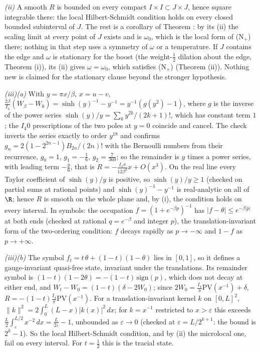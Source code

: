\emph{(ii)} A smooth $R$ is bounded on every compact $I \times I \subset J \times J$, hence square integrable there: the local Hilbert-Schmidt condition holds on every closed bounded subinterval of $J$. The rest is a corollary of Theorem : by its (ii) the scaling limit at every point of $J$ exists and is $\omega_{0}$, which is the local form of (N$_{+}$) there; nothing in that step uses a symmetry of $\omega$ or a temperature. If $J$ contains the edge and $\omega$ is stationary for the boost (the weight-$\tfrac12$ dilation about the edge, Theorem (i)), its (ii) gives $\omega = \omega_{0}$, which satisfies (N$_{+}$) (Theorem (ii)). Nothing new is claimed for the stationary clause beyond the stronger hypothesis.

\emph{(iii)(a)} With $y = \pi x/\beta$, $x = u - v$, $\tfrac{2\beta}{I_{4}}(W_{\beta} - W_{0}) = \sinh(y)^{-1} - y^{-1} = y^{-1}(g(y^{2}) - 1)$, where $g$ is the inverse of the power series $\sinh(y)/y = \sum_{k}y^{2k}/(2k + 1)!$, which has constant term $1$; the $I_{4}0$ prescriptions of the two poles at $y = 0$ coincide and cancel. The check inverts the series exactly to order $y^{18}$ and confirms $g_{n} = 2(1 - 2^{2n - 1})B_{2n}/(2n)!$ with the Bernoulli numbers from their recurrence, $g_{0} = 1$, $g_{1} = -\tfrac16$, $g_{2} = \tfrac{7}{360}$; so the remainder is $y$ times a power series, with leading term $-\tfrac{y}{6}$, that is $R = -\tfrac{I_{4}\pi}{12\beta^{2}}x + O(x^{3})$. On the real line every Taylor coefficient of $\sinh(y)/y$ is positive, so $\sinh(y)/y \ge 1$ (checked on partial sums at rational points) and $\sinh(y)^{-1} - y^{-1}$ is real-analytic on all of $\R$; hence $R$ is smooth on the whole plane and, by (i), the condition holds on every interval. In symbols: the occupation $f = (1 + e^{-\beta p})^{-1}$ has $|f - \theta| \le e^{-\beta|p|}$ at both ends (checked at rational $q = e^{-\beta}$ and integer $p$), the translation-invariant form of the two-ordering condition: $f$ decays rapidly as $p \to -\infty$ and $1 - f$ as $p \to +\infty$.

\emph{(iii)(b)} The symbol $f_{t} = t\,\theta + (1 - t)(1 - \theta)$ lies in $[0, 1]$, so it defines a gauge-invariant quasi-free state, invariant under the translations. Its remainder symbol is $(1 - t)(1 - 2\theta) = -(1 - t)\,\mathrm{sign}(p)$, which does not decay at either end, and $W_{t} - W_{0} = (1 - t)(\delta - 2W_{0})$; since $2W_{0} = \tfrac{I_{4}}{\pi}\mathrm{PV}(x^{-1}) + \delta$, $R = -(1 - t)\tfrac{I_{4}}{\pi}\mathrm{PV}(x^{-1})$. For a translation-invariant kernel $k$ on $[0, L]^{2}$, $\|k\|^{2} = 2\int_{0}^{L}(L - x)|k(x)|^{2}\,dx$; for $k = x^{-1}$ restricted to $x > \varepsilon$ this exceeds $\tfrac{L}{2}\int_{\varepsilon}^{L/2}x^{-2}\,dx = \tfrac{L}{2\varepsilon} - 1$, unbounded as $\varepsilon \to 0$ (checked at $\varepsilon = L/2^{k + 1}$: the bound is $2^{k} - 1$). So the local Hilbert-Schmidt condition, and by (ii) the microlocal one, fail on every interval. For $t = \tfrac12$ this is the tracial state.


